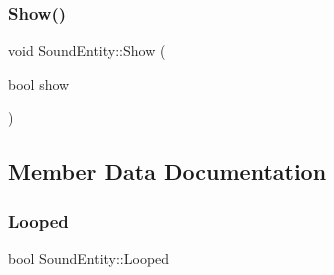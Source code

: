 \hypertarget{class_sound_entity_a776c403e92ba49fd1d953da505b1b900}{}\label{class_sound_entity_a776c403e92ba49fd1d953da505b1b900} 
\subsubsection{\texorpdfstring{Show()}{Show()}}
{\footnotesize\ttfamily void Sound\+Entity\+::\+Show (\begin{DoxyParamCaption}\item[{bool}]{show }\end{DoxyParamCaption})}



\subsection{Member Data Documentation}
\hypertarget{class_sound_entity_af851c6811baeb51e471afee9769badbd}{}\label{class_sound_entity_af851c6811baeb51e471afee9769badbd} 
\subsubsection{\texorpdfstring{Looped}{Looped}}
{\footnotesize\ttfamily bool Sound\+Entity\+::\+Looped}

